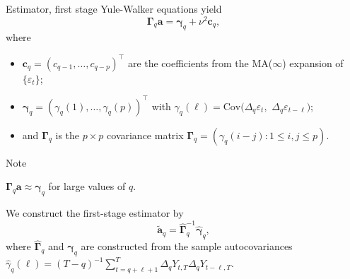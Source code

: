\documentclass[10pt]{beamer}
\newcommand{\Cov}{\mathrm{Cov}}
\begin{document}
\begin{frame}{Estimator, first stage}
Yule-Walker equations yield 
\begin{equation*}\label{YU-eq}
\boldsymbol{\Gamma}_q \boldsymbol{a} = \boldsymbol{\gamma}_q + \nu^2 \boldsymbol{c}_q,  
\end{equation*} 
where
\vspace{-3mm}
\begin{itemize}
	\item $\boldsymbol{c}_q = (c_{q-1},\dots,c_{q-p})^\top$ are the coefficients from the MA($\infty$) expansion of $\{ \varepsilon_t \}$;\pause
	\item $\boldsymbol{\gamma}_q = (\gamma_q(1),\dots,\gamma_q(p))^\top$ with $\gamma_q(\ell) = \Cov(\Delta_q \varepsilon_t,$ $\Delta_q \varepsilon_{t-\ell})$;\pause
	\item and $\boldsymbol{\Gamma}_q$ is the $p \times p$ covariance matrix $\boldsymbol{\Gamma}_q = (\gamma_q(i-j): 1 \le i,j \le p)$.
\end{itemize}\pause
\begin{block}{Note}
\vspace{-3mm}
\begin{center}
$\boldsymbol{\Gamma}_q \boldsymbol{a} \approx \boldsymbol{\gamma}_q$ for large values of $q$.
\end{center}\vspace{-3mm}\end{block}\pause
\vspace{-3mm}

We construct the first-stage estimator by
\begin{equation*}
\widetilde{\boldsymbol{a}}_q = \widehat{\boldsymbol{\Gamma}}_q^{-1} \widehat{\boldsymbol{\gamma}}_q, 
\end{equation*}
where $\widehat{\boldsymbol{\Gamma}}_q$ and $\widehat{\boldsymbol{\gamma}}_q$ are constructed from the sample autocovariances $\widehat{\gamma}_q(\ell) = (T-q)^{-1} \sum_{t=q+\ell+1}^T \Delta_q Y_{t,T} \Delta_q Y_{t-\ell,T}$. 
\end{frame}
\end{document}
